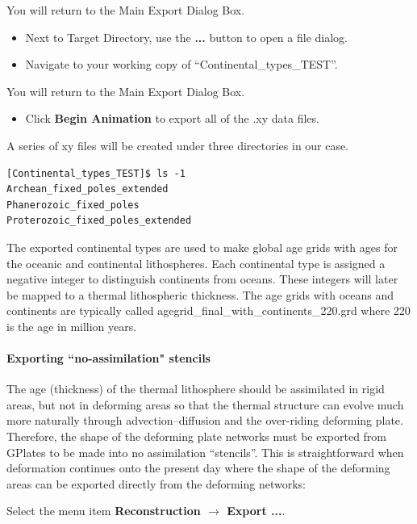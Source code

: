 \documentclass[letterpaper,12pt]{article}
\newcommand{\gp}[1]{\textbf{#1}}
\begin{document}
You will return to the Main Export Dialog Box.

\begin{itemize}
\item Next to Target Directory, use the \gp{...} button to open a file dialog.
\item Navigate to your working copy of ``Continental\_types\_TEST''.
\end{itemize}

You will return to the Main Export Dialog Box.

\begin{itemize}
\item Click \gp{Begin Animation} to export all of the .xy data files.
\end{itemize}

A series of xy files will be created under three directories in our case.

\begin{verbatim}
[Continental_types_TEST]$ ls -1
Archean_fixed_poles_extended
Phanerozoic_fixed_poles
Proterozoic_fixed_poles_extended
\end{verbatim}

The exported continental types are used to make global age grids with ages for the oceanic and continental lithospheres.
Each continental type is assigned a negative integer to distinguish continents from oceans.
These integers will later be mapped to a thermal lithospheric thickness.
The age grids with oceans and continents are typically called agegrid\_final\_with\_continents\_220.grd where 220 is the age in million years.

\paragraph{Exporting ``no-assimilation" stencils}

The age (thickness) of the thermal lithosphere should be assimilated in rigid areas, but not in deforming areas so that the thermal structure can evolve much more naturally through advection--diffusion and the over-riding deforming plate.
Therefore, the shape of the deforming plate networks must be exported from GPlates to be made into no assimilation ``stencils''.
This is straightforward when deformation continues  onto the present day where the shape of the deforming areas can be exported directly from the deforming networks:

Select the menu item \gp{Reconstruction $\rightarrow$ Export ...}.
\end{document}
